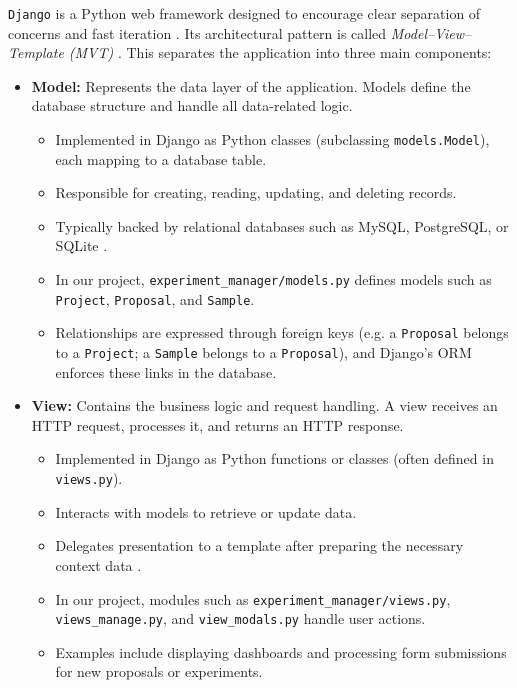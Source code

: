 \texttt{Django} is a Python web framework designed to encourage clear separation of concerns and fast iteration \parencite{DjangoAtAGlance}. Its architectural pattern is called \emph{Model–View–Template (MVT)} \parencite{DjangoFAQMVC}. This separates the application into three main components:

\begin{itemize}
	\item \textbf{Model:} Represents the data layer of the application. Models define the database structure and handle all data-related logic.
	\begin{itemize}
		\item Implemented in Django as Python classes (subclassing \texttt{models.Model}), each mapping to a database table. 
		\item Responsible for creating, reading, updating, and deleting records. 
		\item Typically backed by relational databases such as MySQL, PostgreSQL, or SQLite \parencite{DjangoDatabases}. 
		\item In our project, \texttt{experiment\_manager/models.py} defines models such as \texttt{Project}, \texttt{Proposal}, and \texttt{Sample}. 
		\item Relationships are expressed through foreign keys (e.g. a \texttt{Proposal} belongs to a \texttt{Project}; a \texttt{Sample} belongs to a \texttt{Proposal}), and Django’s ORM enforces these links in the database. 
	\end{itemize}
	
	\item \textbf{View:} Contains the business logic and request handling. A view receives an HTTP request, processes it, and returns an HTTP response.
	\begin{itemize}
		\item Implemented in Django as Python functions or classes (often defined in \texttt{views.py}). 
		\item Interacts with models to retrieve or update data. 
		\item Delegates presentation to a template after preparing the necessary context data \parencite{DjangoViews}. 
		\item In our project, modules such as \texttt{experiment\_manager/views.py}, \texttt{views\_manage.py}, and \texttt{view\_modals.py} handle user actions. 
		\item Examples include displaying dashboards and processing form submissions for new proposals or experiments. 
	\end{itemize}
	

\end{itemize}
